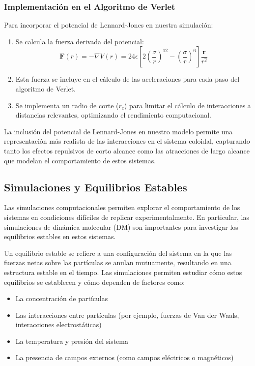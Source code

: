 \documentclass[twocolumn]{article}
\begin{document}
\subsubsection*{Implementación en el Algoritmo de Verlet}
Para incorporar el potencial de Lennard-Jones en nuestra simulación:

\begin{enumerate}
    \item Se calcula la fuerza derivada del potencial:
    \begin{equation}
        \mathbf{F}(r) = -\nabla V(r) = 24\epsilon \left[ 2\left(\frac{\sigma}{r}\right)^{12} - \left(\frac{\sigma}{r}\right)^{6} \right] \frac{\mathbf{r}}{r^2}
    \end{equation}
    \item Esta fuerza se incluye en el cálculo de las aceleraciones para cada paso del algoritmo de Verlet.
    \item Se implementa un radio de corte ($r_c$) para limitar el cálculo de interacciones a distancias relevantes, optimizando el rendimiento computacional.
\end{enumerate}

La inclusión del potencial de Lennard-Jones en nuestro modelo permite una representación más realista de las interacciones en el sistema coloidal, capturando tanto los efectos repulsivos de corto alcance como las atracciones de largo alcance que modelan el comportamiento de estos sistemas.

\subsection*{Simulaciones y Equilibrios Estables}
Las simulaciones computacionales permiten explorar el comportamiento de los sistemas en condiciones difíciles de replicar experimentalmente. En particular, las simulaciones de dinámica molecular (DM) son importantes para investigar los equilibrios estables en estos sistemas.

Un equilibrio estable se refiere a una configuración del sistema en la que las fuerzas netas sobre las partículas se anulan mutuamente, resultando en una estructura estable en el tiempo. Las simulaciones permiten estudiar cómo estos equilibrios se establecen y cómo dependen de factores como:

\begin{itemize}
    \item La concentración de partículas
    \item Las interacciones entre partículas (por ejemplo, fuerzas de Van der Waals, interacciones electrostáticas)
    \item La temperatura y presión del sistema
    \item La presencia de campos externos (como campos eléctricos o magnéticos)
\end{itemize}
\end{document}
